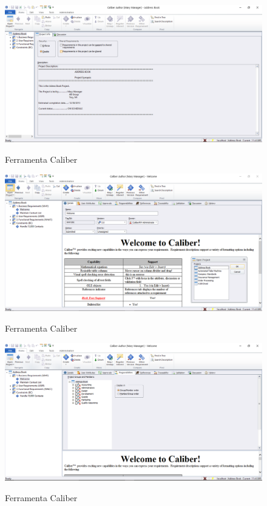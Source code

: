 \FloatBarrier
\begin{figure}[!htpd]
		\centering
		\includegraphics[scale=0.4]{figuras/caliber_1}
		\label{img:SAF}
		\caption{Ferramenta Caliber }
\end{figure}
\FloatBarrier

\FloatBarrier
\begin{figure}[!htpd]
		\centering
		\includegraphics[scale=0.5]{figuras/caliber_2}
		\label{img:SAF}
		\caption{Ferramenta Caliber }
\end{figure}
\FloatBarrier

\FloatBarrier
\begin{figure}[!htpd]
		\centering
		\includegraphics[scale=0.4]{figuras/caliber_3}
		\label{img:SAF}
		\caption{Ferramenta Caliber }
\end{figure}
\FloatBarrier



